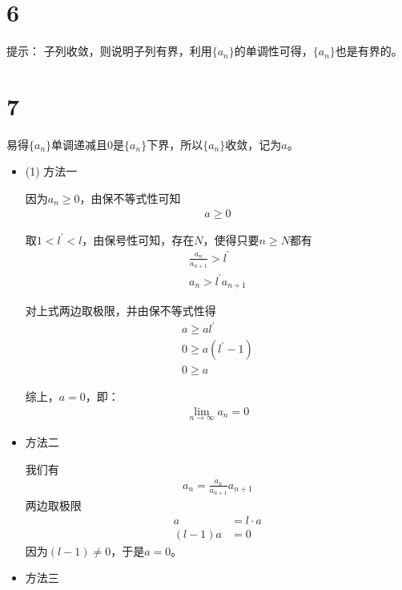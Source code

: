 \documentclass{article}
\begin{document}
\section*{6}
提示：
子列收敛，则说明子列有界，利用$\{a_n\}$的单调性可得，$\{a_n\}$也是有界的。

\section*{7}

易得$\{a_n\}$单调递减且$0$是$\{a_n\}$下界，所以$\{a_n\}$收敛，记为$a$。

\begin{itemize}
  \item (1) 方法一

        因为$a_n \geq 0$，由保不等式性可知
        \begin{align*}
          a \geq 0
        \end{align*}

        取$1 < l^\prime < l$，由保号性可知，存在$N$，使得只要$n \geq N$都有
        \begin{align*}
          \frac{a_n}{a_{n + 1}} > l^\prime \\
          a_n > l^\prime a_{n + 1}
        \end{align*}

        对上式两边取极限，并由保不等式性得
        \begin{align*}
          a \geq a l^\prime      \\
          0 \geq a(l^\prime - 1) \\
          0 \geq a
        \end{align*}

        综上，$a = 0$，即：
        \begin{align*}
          \lim_{n \to \infty} a_n = 0
        \end{align*}

  \item 方法二

        我们有
        \begin{align*}
          a_n = \frac{a_n}{a_{n + 1}} a_{n + 1}
        \end{align*}
        两边取极限
        \begin{align*}
          a         & = l \cdot a \\
          (l - 1) a & = 0
        \end{align*}
        因为$(l - 1) \neq 0$，于是$a = 0$。

  \item 方法三


\end{itemize}
\end{document}
